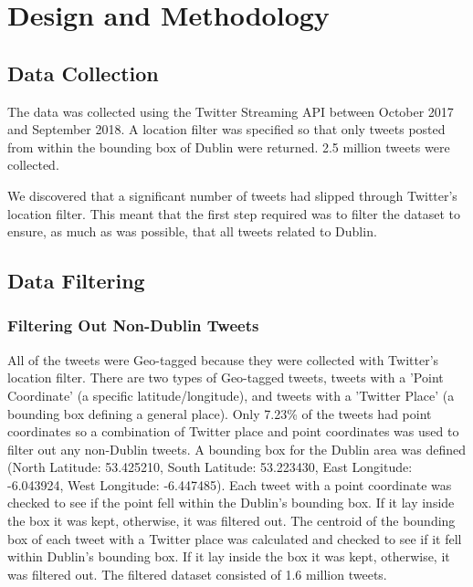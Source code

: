 \section{Design and Methodology}

\subsection{Data Collection}
The data was collected using the Twitter Streaming API between October 2017 and September 2018. A location filter was specified so that only tweets posted from within the bounding box of Dublin were returned. 2.5 million tweets were collected.

We discovered that a significant number of tweets had slipped through Twitter's location filter. This meant that the first step required was to filter the dataset to ensure, as much as was possible, that all tweets related to Dublin.

\subsection{Data Filtering}

\subsubsection{Filtering Out Non-Dublin Tweets}
All of the tweets were Geo-tagged because they were collected with Twitter's location filter. There are two types of Geo-tagged tweets, tweets with a 'Point Coordinate' (a specific latitude/longitude), and tweets with a 'Twitter Place' (a bounding box defining a general place). Only 7.23\% of the tweets had point coordinates so a combination of Twitter place and point coordinates was used to filter out any non-Dublin tweets. A bounding box for the Dublin area was defined (North Latitude: 53.425210, South Latitude: 53.223430, East Longitude: -6.043924, West Longitude: -6.447485). Each tweet with a point coordinate was checked to see if the point fell within the Dublin's bounding box. If it lay inside the box it was kept, otherwise, it was filtered out. The centroid of the bounding box of each tweet with a Twitter place was calculated and checked to see if it fell within Dublin's bounding box. If it lay inside the box it was kept, otherwise, it was filtered out. The filtered dataset consisted of 1.6 million tweets.


